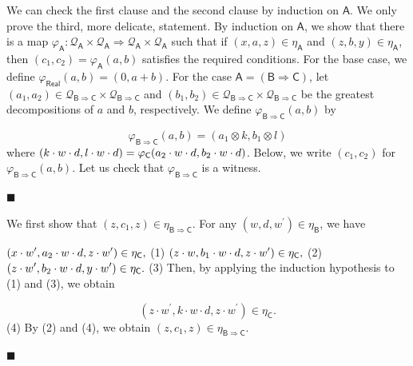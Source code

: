 We can check the first clause and the second clause by induction on $\mathsf{A}$. We only prove the third, more delicate, statement. By induction on $\mathsf{A}$, we show that there is a map $\varphi_{\mathsf{A}}\colon\mathcal{Q}_{\mathsf{A}}\times\mathcal{Q}_{\mathsf{A%
}}\Rightarrow\mathcal{Q}_{\mathsf{A}}\times\mathcal{Q}_{\mathsf{A}}$ such that if $(x,a,z)\in\eta_{\mathsf{A}}$ and $(z,b,y)\in\eta_{\mathsf{A}}$, then $(c_{1},c_{2})=\varphi_{\mathsf{A}}(a,b)$ satisfies the required conditions. For the base case, we define $\varphi_{\mathsf{Real}}(a,b)=(0,a+b)$. For the case $\mathsf{A}=(\mathsf{B}\Rightarrow\mathsf{C})$, let $(a_{1},a_{2})\in\mathcal{Q}_{\mathsf{B}\Rightarrow\mathsf{C}}\times\mathcal{Q}%
_{\mathsf{B}\Rightarrow\mathsf{C}}$ and $(b_{1},b_{2})\in\mathcal{Q}_{\mathsf{B}\Rightarrow\mathsf{C}}\times\mathcal{Q}%
_{\mathsf{B}\Rightarrow\mathsf{C}}$ be the greatest decompositions of $a$ and $b$, respectively. We define $\varphi_{\mathsf{B}\Rightarrow\mathsf{C}}(a,b)$ by\par
    \[\varphi_{\mathsf{B}\Rightarrow\mathsf{C}}(a,b)=(a_{1}\otimes k,b_{1}\otimes l)\]    
where $(k\cdot w\cdot d,l\cdot w\cdot d)=\varphi_{\mathsf{C}}(a_{2}\cdot w\cdot d,b_{%
2}\cdot w\cdot d)$. Below, we write $(c_{1},c_{2})$ for $\varphi_{\mathsf{B}\Rightarrow\mathsf{C}}(a,b)$. Let us check that $\varphi_{\mathsf{B}\Rightarrow\mathsf{C}}$ is a witness.\par
  
\par\noindent  $\blacksquare$ 
 
We first show that $(z,c_{1},z)\in\eta_{\mathsf{B}\Rightarrow\mathsf{C}}$. For any $(w,d,w^{\prime})\in\eta_{\mathsf{B}}$, we have\par
    $\displaystyle(x\cdot w^{\prime},a_{2}\cdot w\cdot d,z\cdot w^{\prime})\in\eta_%
{\mathsf{C}},$  (1)    $\displaystyle(z\cdot w,b_{1}\cdot w\cdot d,z\cdot w^{\prime})\in\eta_{\mathsf{%
C}},$  (2)    $\displaystyle(z\cdot w^{\prime},b_{2}\cdot w\cdot d,y\cdot w^{\prime})\in\eta_%
{\mathsf{C}}.$  (3)   
Then, by applying the induction hypothesis to (1) and (3), we obtain\par
    \[(z\cdot w^{\prime},k\cdot w\cdot d,z\cdot w^{\prime})\in\eta_{\mathsf{C}}.\]  (4)   
By (2) and (4), we obtain $(z,c_{1},z)\in\eta_{\mathsf{B}\Rightarrow\mathsf{C}}$.\par
 
 
 
\par\noindent  $\blacksquare$ 
 
